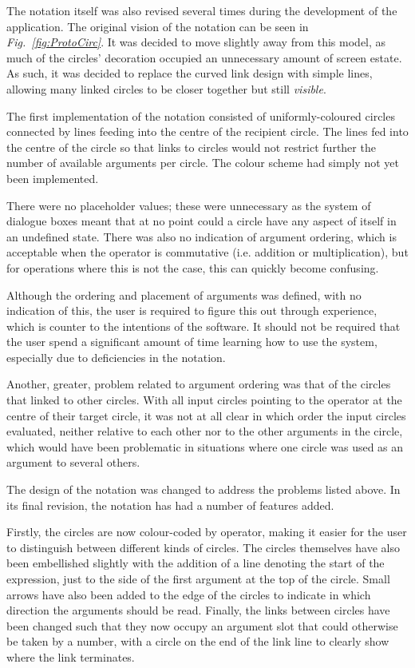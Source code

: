 \documentclass[12pt,twoside,notitlepage,xetex]{report}
\begin{document}
{The notation itself was also revised several times during the development of the application.  The original vision of the notation can be seen in \emph{Fig.~\ref{fig:ProtoCirc}}.  It was decided to move slightly away from this model, as much of the circles' decoration occupied an unnecessary amount of screen estate. As such, it was decided to replace the curved link design with simple lines, allowing many linked circles to be closer together but still \emph{visible}.

The first implementation of the notation consisted of uniformly-coloured circles connected by lines feeding into the centre of the recipient circle.  The lines fed into the centre of the circle so that links to circles would not restrict further the number of available arguments per circle.  The colour scheme had simply not yet been implemented.

There were no placeholder values; these were unnecessary as the system of dialogue boxes meant that at no point could a circle have any
aspect of itself in an undefined state.  There was also no indication of argument ordering, which is acceptable when the operator is commutative (i.e. addition or multiplication), but for operations where this is not the case, this can quickly become confusing.

Although the ordering and placement of arguments was defined, with no indication of this, the user is required to figure this out through experience, which is counter to the intentions of the software.  It should not be required that the user spend a significant amount of time learning how to use the system, especially due to deficiencies in the notation.

Another, greater, problem related to argument ordering was that of the circles that linked to other circles.  With all input circles pointing to the operator at the centre of their target circle, it was not at all clear in which order the input circles evaluated, neither relative to each other nor to the other arguments in the circle, which would have been problematic in situations where one circle was used as an argument to several others.

The design of the notation was changed to address the problems listed above.  In its final revision, the notation has had a number of features added.

Firstly, the circles are now colour-coded by operator, making it easier for the user to distinguish between different kinds of circles.  The circles themselves have also been embellished slightly with the addition of a line denoting the start of the expression, just to the side of the first argument at the top of the circle.  Small arrows have also been added to the edge of the circles to indicate in which direction the arguments should be read.  Finally, the links between circles have been changed such that they now occupy an argument slot that could otherwise be taken by a number, with a circle on the end of the link line to clearly show where the link terminates.

}
\end{document}
